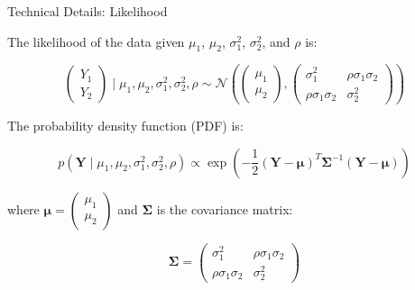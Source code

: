 \begin{frame}{Technical Details: Likelihood}

The likelihood of the data given $\mu_1$, $\mu_2$, $\sigma_1^2$, $\sigma_2^2$, and $\rho$ is:

$$
\begin{pmatrix}
Y_1 \\
Y_2
\end{pmatrix}
\mid \mu_1, \mu_2, \sigma_1^2, \sigma_2^2, \rho
\sim \mathcal{N}
\left( 
\begin{pmatrix}
\mu_1 \\
\mu_2
\end{pmatrix},
\begin{pmatrix}
\sigma_1^2 & \rho \sigma_1 \sigma_2 \\
\rho \sigma_1 \sigma_2 & \sigma_2^2
\end{pmatrix}
\right)
$$

The probability density function (PDF) is:

$$
p(\mathbf{Y} \mid \mu_1, \mu_2, \sigma_1^2, \sigma_2^2, \rho) \propto \exp\left( -\frac{1}{2} (\mathbf{Y} - \boldsymbol{\mu})^T \boldsymbol{\Sigma}^{-1} (\mathbf{Y} - \boldsymbol{\mu}) \right)
$$

where $\boldsymbol{\mu} = \begin{pmatrix} \mu_1 \\ \mu_2 \end{pmatrix}$ and $\boldsymbol{\Sigma}$ is the covariance matrix:

$$
\boldsymbol{\Sigma} = 
\begin{pmatrix}
\sigma_1^2 & \rho \sigma_1 \sigma_2 \\
\rho \sigma_1 \sigma_2 & \sigma_2^2
\end{pmatrix}
$$

\end{frame}

